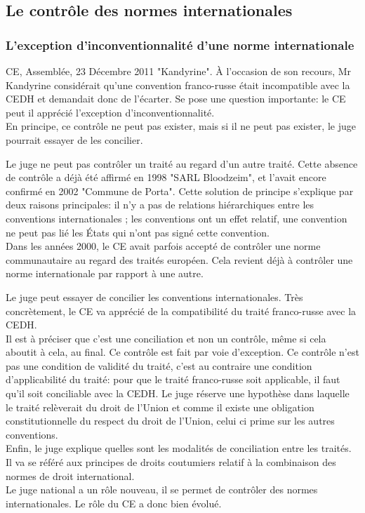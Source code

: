 \documentclass[10pt, a4paper, openany]{book}
\begin{document}
\subsection{Le contrôle des normes internationales}

\subsubsection{L'exception d'inconventionnalité d'une norme internationale}

CE, Assemblée, 23 Décembre 2011 "Kandyrine". À l'occasion de son recours, Mr Kandyrine considérait qu'une convention franco-russe était incompatible avec la CEDH et demandait donc de l'écarter. Se pose une question importante: le CE peut il apprécié l'exception d'inconventionnalité. \\
En principe, ce contrôle ne peut pas exister, mais si il ne peut pas exister, le juge pourrait essayer de les concilier.


Le juge ne peut pas contrôler un traité au regard d'un autre traité. Cette absence de contrôle a déjà été affirmé en 1998 "SARL Bloodzeim", et l'avait encore confirmé en 2002 "Commune de Porta". Cette solution de principe s'explique par deux raisons principales: il n'y a pas de relations hiérarchiques entre les conventions internationales ; les conventions ont un effet relatif, une convention ne peut pas lié les États qui n'ont pas signé cette convention. \\
Dans les années 2000, le CE avait parfois accepté de contrôler une norme communautaire au regard des traités européen. Cela revient déjà à contrôler une norme internationale par rapport à une autre.


Le juge peut essayer de concilier les conventions internationales. Très concrètement, le CE va apprécié de la compatibilité du traité franco-russe avec la CEDH. \\
Il est à préciser que c'est une conciliation et non un contrôle, même si cela aboutit à cela, au final. Ce contrôle est fait par voie d'exception. Ce contrôle n'est pas une condition de validité du traité, c'est au contraire une condition d'applicabilité du traité: pour que le traité franco-russe soit applicable, il faut qu'il soit conciliable avec la CEDH. Le juge réserve une hypothèse dans laquelle le traité relèverait du droit de l'Union et comme il existe une obligation constitutionnelle du respect du droit de l'Union, celui ci prime sur les autres conventions. \\
Enfin, le juge explique quelles sont les modalités de conciliation entre les traités. Il va se référé aux principes de droits coutumiers relatif à la combinaison des normes de droit international. \\
Le juge national a un rôle nouveau, il se permet de contrôler des normes internationales. Le rôle du CE a donc bien évolué. 
\end{document}
